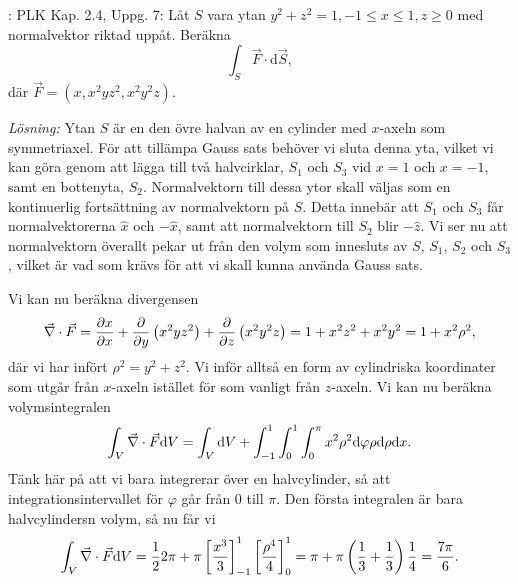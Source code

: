 \documentclass[%
oneside,                 %
final,                   %
10pt]{article}
\newcommand{\shortinlinecomment}[3]{{\color{red}{\bf #1}: #2}}
\newenvironment{notice_mdfboxadmon}[1][]{
\begin{notice_mdfboxmdframed}[frametitle=#1]
}
{
\end{notice_mdfboxmdframed}
}
\begin{document}
\begin{notice_mdfboxadmon}

\shortinlinecomment{Kommentar 4}{ PLK Kap. 2.4, Uppg. 7: }{ PLK Kap. 2.4, Uppg. }  Låt $S$ vara ytan $y^2 + z^2 = 1, -1 \le x \le 1, z \ge 0$ med normalvektor riktad uppåt.  Beräkna 
\begin{equation}
  \int_S \vec{F} \cdot \mbox{d}\vec{S},
\end{equation}
där $\vec{F} = \left( x, x^2yz^2, x^2 y^2 z\right)$.

\emph{Lösning:}  
Ytan $S$ är en den övre halvan av en cylinder med $x$-axeln som symmetriaxel.  För att tillämpa Gauss sats behöver vi sluta denna yta, vilket vi kan göra genom att lägga till  två halvcirklar, $S_1$ och $S_3$ vid $x = 1$ och $x = -1$, samt en bottenyta, $S_2$.  Normalvektorn till dessa ytor skall väljas som en kontinuerlig fortsättning av normalvektorn på $S$.  Detta innebär att $S_1$ och $S_3$ får normalvektorerna $\hat{x}$ och $-\hat{x}$, samt att normalvektorn till $S_2$ blir $-\hat{z}$.  Vi ser nu att  normalvektorn överallt pekar ut från den volym som innesluts av $S$, $S_1$, $S_2$ och $S_3$, vilket är vad som krävs för att vi skall kunna använda Gauss sats.

Vi kan nu beräkna divergensen
\begin{equation}
  \vec{\nabla} \cdot \vec{F} = \frac{\partial x}{\partial x} + 
\frac{\partial}{\partial y}\left(x^2yz^2\right) + \frac{\partial}{\partial z}
\left(x^2y^2z\right) = 1 + x^2z^2 + x^2 y^2 = 1 + x^2\rho^2,
\end{equation}
där vi har infört $\rho^2 = y^2 + z^2$.  Vi inför alltså en form av cylindriska koordinater som utgår från $x$-axeln istället för som vanligt från $z$-axeln.  Vi kan nu beräkna volymsintegralen
\begin{equation}
  \int_V \vec{\nabla} \cdot \vec{F} \mbox{d}V = \int_V \mbox{d}V + 
\int_{-1}^1\int_0^1\int_0^\pi x^2 \rho^2 \mbox{d}\varphi \rho \mbox{d}\rho
\mbox{d}x.
\end{equation}
Tänk här på att vi bara integrerar över en halvcylinder, så att integrationsintervallet för $\varphi$ går från 0 till $\pi$.  Den första integralen är bara halvcylindersn volym, så nu får vi
\begin{equation}
  \int_V \vec{\nabla} \cdot \vec{F} \mbox{d}V = \frac{1}{2} 2 \pi + \pi  \left[\frac{x^3}{3}\right]_{-1}^1 \left[\frac{\rho^4}{4}\right]_0^1 =
\pi + \pi\left(\frac{1}{3} + \frac{1}{3}\right) \frac{1}{4} = \frac{7\pi}{6}.
\end{equation}


\end{notice_mdfboxadmon}
\end{document}
